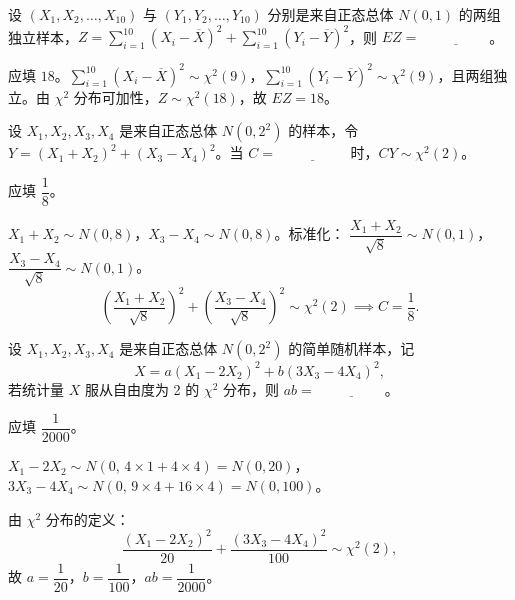 \documentclass[lang=cn,11pt]{elegantbook}
\begin{document}
\begin{exercise}\label{exer:6-chi2-ez}
设 \((X_1, X_2, \dots, X_{10})\) 与 \((Y_1, Y_2, \dots, Y_{10})\) 分别是来自正态总体 \(N(0,1)\) 的两组独立样本，\(Z = \sum_{i=1}^{10}(X_i-\overline{X})^2 + \sum_{i=1}^{10}(Y_i-\overline{Y})^2\)，则 \(EZ =\,\underline{\hspace{2cm}}\)。
\end{exercise}
\begin{solution}
应填 \(18\)。\(\sum_{i=1}^{10}(X_i-\overline{X})^2 \sim \chi^2(9)\)，\(\sum_{i=1}^{10}(Y_i-\overline{Y})^2 \sim \chi^2(9)\)，且两组独立。由 \(\chi^2\) 分布可加性，\(Z \sim \chi^2(18)\)，故 \(EZ = 18\)。
\end{solution}


\begin{exercise}\label{exer:6-chi2-basic}
设 \(X_1, X_2, X_3, X_4\) 是来自正态总体 \(N(0, 2^2)\) 的样本，令 \(Y = (X_1+X_2)^2 + (X_3-X_4)^2\)。当 \(C =\,\underline{\hspace{2cm}}\) 时，\(CY \sim \chi^2(2)\)。
\end{exercise}

\begin{solution}
应填 \(\dfrac{1}{8}\)。

\(X_1+X_2 \sim N(0, 8)\)，\(X_3-X_4 \sim N(0, 8)\)。标准化：
\(\dfrac{X_1+X_2}{\sqrt{8}} \sim N(0,1)\)，\(\dfrac{X_3-X_4}{\sqrt{8}} \sim N(0,1)\)。
\[
\left(\frac{X_1+X_2}{\sqrt{8}}\right)^{\!2} + \left(\frac{X_3-X_4}{\sqrt{8}}\right)^{\!2} \sim \chi^2(2) \implies C = \frac{1}{8}.
\]
\end{solution}

\begin{exercise}\label{exer:6-chi2-ab}
设 \(X_1, X_2, X_3, X_4\) 是来自正态总体 \(N(0, 2^2)\) 的简单随机样本，记
\[
X = a(X_1 - 2X_2)^2 + b(3X_3 - 4X_4)^2,
\]
若统计量 \(X\) 服从自由度为 2 的 \(\chi^2\) 分布，则 \(ab =\,\underline{\hspace{2cm}}\)。
\end{exercise}

\begin{solution}
应填 \(\dfrac{1}{2000}\)。

\(X_1 - 2X_2 \sim N(0,\, 4 \times 1 + 4 \times 4) = N(0, 20)\)，\(3X_3 - 4X_4 \sim N(0,\, 9 \times 4 + 16 \times 4) = N(0, 100)\)。

由 \(\chi^2\) 分布的定义：
\[
\frac{(X_1-2X_2)^2}{20} + \frac{(3X_3-4X_4)^2}{100} \sim \chi^2(2),
\]
故 \(a = \dfrac{1}{20}\)，\(b = \dfrac{1}{100}\)，\(ab = \dfrac{1}{2000}\)。
\end{solution}
\end{document}
